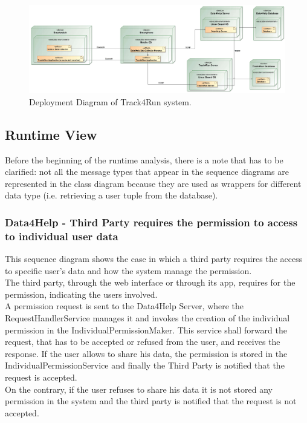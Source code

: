 \documentclass[a4paper]{article}
\begin{document}
\begin{figure}[H]
    \centering
    \includegraphics[width=\linewidth]{deploymentDiagram-Track4Run}
    \caption{Deployment Diagram of Track4Run system.}
    \label{fig:my_label}
\end{figure}
\clearpage

\subsection{Runtime View}
Before the beginning of the runtime analysis, there is a note that has to be clarified: not all the message types that appear in the sequence diagrams are represented in the class diagram because they are used as wrappers for different data type (i.e. retrieving a user tuple from the database).

\subsubsection{Data4Help - Third Party requires the permission to access to individual user data}
This sequence diagram shows the case in which a third party requires the access to specific user's data and how the system manage the permission. \\
The third party, through the web interface or through its app, requires for the permission, indicating the users involved.\\
A permission request is sent to the Data4Help Server, where the RequestHandlerService manages it and invokes the creation of the individual permission in the IndividualPermissionMaker. This service shall forward the request, that has to be accepted or refused from the user, and receives the response. If the user allows to share his data, the permission is stored in the IndividualPermissionService and finally the Third Party is notified that the request is accepted.\\
On the contrary, if the user refuses to share his data it is not stored any permission in the system and the third party is notified that the request is not accepted.
\end{document}
